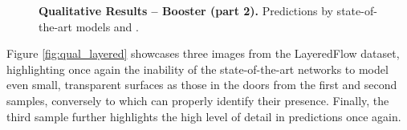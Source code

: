 \begin{figure}[t]
\begin{tabular}{ccc}
    \end{tabular}\vspace{-0.3cm}
    \caption{\textbf{Qualitative Results -- Booster (part 2).} Predictions by state-of-the-art models and \method.}
    \label{fig:qual_booster_2}\vspace{-0.3cm}
\end{figure}

\clearpage

Figure \ref{fig:qual_layered} showcases three images from the LayeredFlow dataset, highlighting once again the inability of the state-of-the-art networks to model even small, transparent surfaces as those in the doors from the first and second samples, conversely to \method which can properly identify their presence. Finally, the third sample further highlights the high level of detail in \method predictions  once again.

